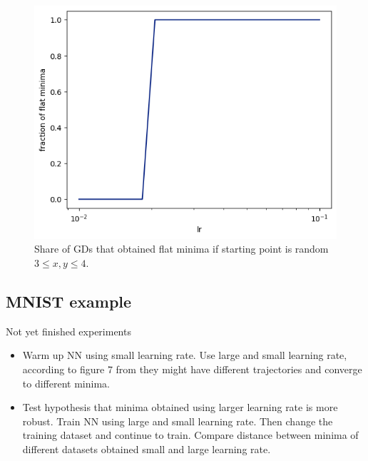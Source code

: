 \documentclass{article}
\theoremstyle{definition}
\begin{document}
\begin{figure}[h]
    \begin{center}
        \caption{Share of GDs that obtained flat minima if starting point is random $3 \leq x, y \leq 4$.}
        \includegraphics[scale=0.7]{2d_example_lr_vs_minima.png}        
    \end{center}
\end{figure}

\subsection{MNIST example}
Not yet finished experiments
\begin{itemize}
    \item Warm up NN using small learning rate.
    Use large and small learning rate,
    according to figure 7 from \cite{mohtashami2023special} 
    they might have different trajectories and converge to 
    different minima. 

    \item Test hypothesis that minima obtained using larger 
    learning rate is more robust. 
    Train NN using large and small learning rate.
    Then change the training dataset and continue to train.
    Compare distance between minima of different datasets 
    obtained small and large learning rate.  

\end{itemize}



\end{document}
